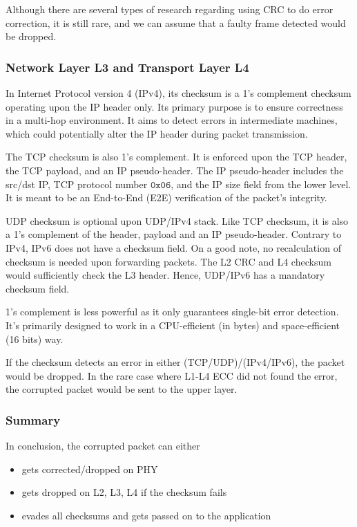 \documentclass[12pt]{article}
\begin{document}
Although there are several types of research regarding using CRC to do error correction, it is still rare, and we can assume that a faulty frame detected would be dropped.

\subsubsection{Network Layer L3 and Transport Layer L4}

In Internet Protocol version 4 (IPv4), its checksum is a 1's complement checksum operating upon the IP header only. Its primary purpose is to ensure correctness in a multi-hop environment. It aims to detect errors in intermediate machines, which could potentially alter the IP header during packet transmission.

The TCP checksum is also 1's complement. It is enforced upon the TCP header, the TCP payload, and an IP pseudo-header. The IP pseudo-header includes the src/dst IP, TCP protocol number $\mathtt{0x06}$, and the IP size field from the lower level. It is meant to be an End-to-End (E2E) verification of the packet's integrity.

UDP checksum is optional upon UDP/IPv4 stack. Like TCP checksum, it is also a 1's complement of the header, payload and an IP pseudo-header. Contrary to IPv4, IPv6 does not have a checksum field. On a good note, no recalculation of checksum is needed upon forwarding packets. The L2 CRC and  L4 checksum would sufficiently check the L3 header. Hence, UDP/IPv6 has a mandatory checksum field.

1's complement is less powerful as it only guarantees single-bit error detection. It's primarily designed to work in a CPU-efficient (in bytes) and space-efficient (16 bits) way.

If the checksum detects an error in either (TCP/UDP)/(IPv4/IPv6), the packet would be dropped. In the rare case where L1-L4 ECC did not found the error, the corrupted packet would be sent to the upper layer.

\subsubsection{Summary}

In conclusion, the corrupted packet can either
\begin{itemize}
  \item gets corrected/dropped on PHY
  \item gets dropped on L2, L3, L4 if the checksum fails
  \item evades all checksums and gets passed on to the application
\end{itemize}
\end{document}
